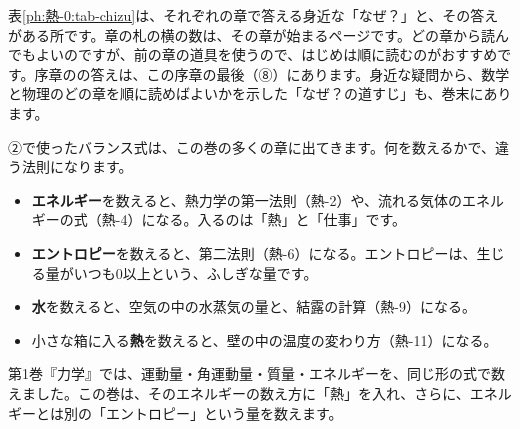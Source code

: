 \noindent 表\ref{ph:熱-0:tab-chizu}は、それぞれの章で答える身近な「なぜ？」と、その答えがある所です。章の札の横の数は、その章が始まるページです。どの章から読んでもよいのですが、前の章の道具を使うので、はじめは順に読むのがおすすめです。序章の\bkhatenaref の答えは、この序章の最後（⑧）にあります。身近な疑問から、数学と物理のどの章を順に読めばよいかを示した「なぜ？の道すじ」も、巻末にあります。

\leavevmode\label{ph:熱-0:sec5}②で使ったバランス式は、この巻の多くの章に出てきます。何を数えるかで、違う法則になります。
\begin{itemize}[leftmargin=1.2\zw, itemsep=2pt, topsep=2pt, label={\color{bkTheme}●}]
\item \textbf{エネルギー}を数えると、熱力学の第一法則（熱-2）や、流れる気体のエネルギーの式（熱-4）になる。入るのは「熱」と「仕事」です。
\item \textbf{エントロピー}を数えると、第二法則（熱-6）になる。エントロピーは、生じる量がいつも0以上という、ふしぎな量です。
\item \textbf{水}を数えると、空気の中の水蒸気の量と、結露の計算（熱-9）になる。
\item 小さな箱に入る\textbf{熱}を数えると、壁の中の温度の変わり方（熱-11）になる。
\end{itemize}
第1巻『力学』では、運動量・角運動量・質量・エネルギーを、同じ形の式で数えました。この巻は、そのエネルギーの数え方に「熱」を入れ、さらに、エネルギーとは別の「エントロピー」という量を数えます。

